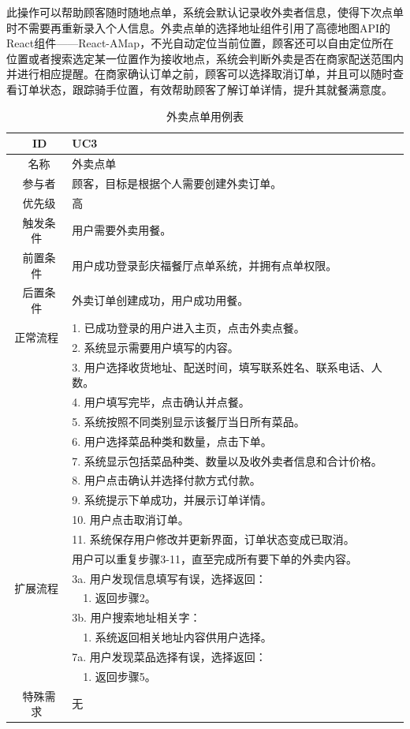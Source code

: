 此操作可以帮助顾客随时随地点单，系统会默认记录收外卖者信息，使得下次点单时不需要再重新录入个人信息。外卖点单的选择地址组件引用了高德地图API的React组件——React-AMap，不光自动定位当前位置，顾客还可以自由定位所在位置或者搜索选定某一位置作为接收地点，系统会判断外卖是否在商家配送范围内并进行相应提醒。在商家确认订单之前，顾客可以选择取消订单，并且可以随时查看订单状态，跟踪骑手位置，有效帮助顾客了解订单详情，提升其就餐满意度。
\begin{table}[htbp!]
  \footnotesize
  \centering
  \caption{外卖点单用例表}
  \vspace{2mm}
  \begin{tabular}{cp{11.5cm}}
   \hline
   \ ID & UC3 \\ 
   \hline
   \ 名称 & 外卖点单 \\ 
   \hline
   \ 参与者 & 顾客，目标是根据个人需要创建外卖订单。 \\ 
   \hline
   \ 优先级 & 高 \\ 
   \hline
   \ 触发条件 & 用户需要外卖用餐。 \\ 
   \hline
   \ 前置条件 & 用户成功登录彭庆福餐厅点单系统，并拥有点单权限。 \\ 
   \hline
   \ 后置条件 & 外卖订单创建成功，用户成功用餐。 \\ 
   \hline
   \multirow{2}{*}{正常流程}
    & 1.	已成功登录的用户进入主页，点击外卖点餐。\\
    & 2.	系统显示需要用户填写的内容。\\
    & 3.	用户选择收货地址、配送时间，填写联系姓名、联系电话、人数。\\
    & 4.	用户填写完毕，点击确认并点餐。\\
    & 5.	系统按照不同类别显示该餐厅当日所有菜品。\\
    & 6.	用户选择菜品种类和数量，点击下单。\\
    & 7.	系统显示包括菜品种类、数量以及收外卖者信息和合计价格。\\
    & 8.	用户点击确认并选择付款方式付款。\\
    & 9.  系统提示下单成功，并展示订单详情。 \\
    & 10.	用户点击取消订单。\\
    & 11.  系统保存用户修改并更新界面，订单状态变成已取消。 \\
    & 用户可以重复步骤3-11，直至完成所有要下单的外卖内容。\\
   \hline
   \multirow{2}{*}{扩展流程}
    & 3a. 用户发现信息填写有误，选择返回：\\
    & ~~1.	返回步骤2。\\
    & 3b. 用户搜索地址相关字：\\
    & ~~1.	系统返回相关地址内容供用户选择。\\
    & 7a. 用户发现菜品选择有误，选择返回：\\
    & ~~1.	返回步骤5。\\
  \hline
  \ 特殊需求 & 无 \\ 
  \hline
  \end{tabular}
  \label{table:uc2}
\end{table}

